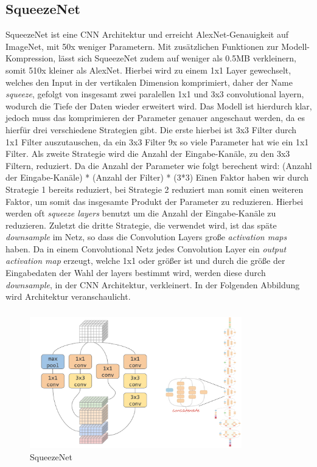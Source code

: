 \subsection{SqueezeNet}

SqueezeNet ist eine CNN Architektur und erreicht AlexNet-Genauigkeit auf ImageNet, mit 50x weniger Parametern. Mit zusätzlichen Funktionen zur Modell-Kompression, lässt sich SqueezeNet zudem auf weniger als 0.5MB verkleinern, somit 510x kleiner als AlexNet.
\newline Hierbei wird zu einem 1x1 Layer gewechselt, welches den Input in der vertikalen Dimension komprimiert, daher der Name \textit{squeeze}, gefolgt von insgesamt zwei paralellen 1x1 und 3x3 convolutional layern, wodurch die Tiefe der Daten wieder erweitert wird.
\newline Das Modell ist hierdurch klar, jedoch muss das komprimieren der Parameter genauer angeschaut werden, da es hierfür drei verschiedene Strategien gibt. Die erste hierbei ist 3x3 Filter durch 1x1 Filter auszutauschen, da ein 3x3 Filter 9x so viele Parameter hat wie ein 1x1 Filter. Als zweite Strategie wird die Anzahl der Eingabe-Kanäle, zu den 3x3 Filtern, reduziert. Da die Anzahl der Parameter wie folgt berechent wird: 
\newline (Anzahl der Eingabe-Kanäle) * (Anzahl der Filter) * (3*3)
Einen Faktor haben wir durch Strategie 1 bereits reduziert, bei Strategie 2 reduziert man somit einen weiteren Faktor, um somit das insgesamte Produkt der Parameter zu reduzieren. Hierbei werden oft \textit{squeeze layers} benutzt um die Anzahl der Eingabe-Kanäle zu reduzieren. Zuletzt die dritte Strategie, die verwendet wird, ist das späte \textit{downsample} im Netz, so dass die Convolution Layers große \textit{activation maps} haben. Da in einem Convolutional Netz jedes Convolution Layer ein \textit{output activation map} erzeugt, welche 1x1 oder größer ist und durch die größe der Eingabedaten der Wahl der layers bestimmt wird, werden diese durch \textit{downsample}, in der CNN Architektur, verkleinert. In der Folgenden Abbildung wird Architektur veranschaulicht.

\subsubsection*{}
\begin{figure}[h]
    \centering
    \includegraphics[width=0.82\textwidth]{Bilder/SqueezeNetModel.png}
    \caption{SqueezeNet}
    \label{fig:SqueezeNet}
\end{figure}
